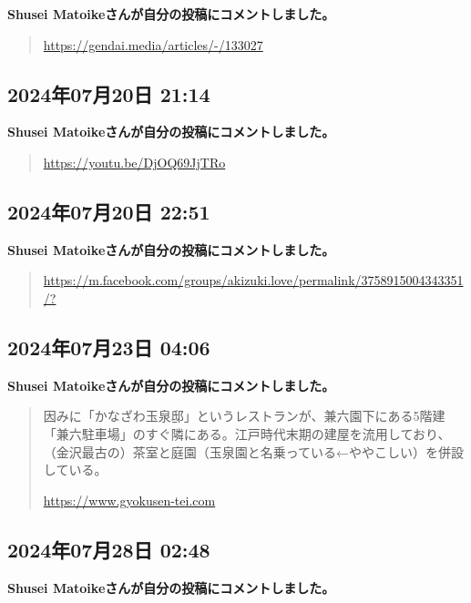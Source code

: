 \textbf{Shusei Matoikeさんが自分の投稿にコメントしました。}

\begin{quote}
\url{https://gendai.media/articles/-/133027}
\end{quote}

\subsection*{2024年07月20日 21:14}

\textbf{Shusei Matoikeさんが自分の投稿にコメントしました。}

\begin{quote}
\url{https://youtu.be/DjOQ69JjTRo}
\end{quote}

\subsection*{2024年07月20日 22:51}

\textbf{Shusei Matoikeさんが自分の投稿にコメントしました。}

\begin{quote}
\url{https://m.facebook.com/groups/akizuki.love/permalink/3758915004343351/?}
\end{quote}

\subsection*{2024年07月23日 04:06}

\textbf{Shusei Matoikeさんが自分の投稿にコメントしました。}

\begin{quote}
因みに「かなざわ玉泉邸」というレストランが、兼六園下にある5階建「兼六駐車場」のすぐ隣にある。江戸時代末期の建屋を流用しており、（金沢最古の）茶室と庭園（玉泉園と名乗っている←ややこしい）を併設している。

\url{https://www.gyokusen-tei.com}
\end{quote}

\subsection*{2024年07月28日 02:48}

\textbf{Shusei Matoikeさんが自分の投稿にコメントしました。}

